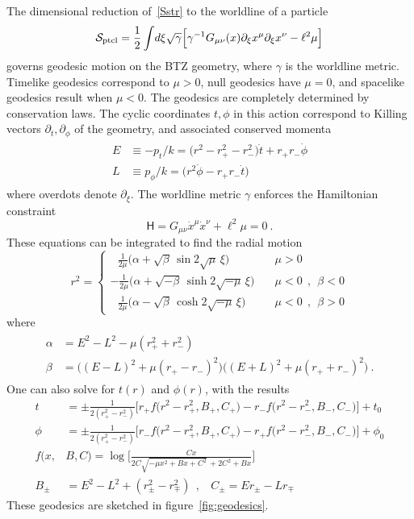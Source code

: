 \documentclass[11pt]{article}
\newcommand{\rcite}{\cite}
\def\tight#1{\! #1 \!}  %
\def\[{\left[}
\def\sfH{{\mathsf H}}
\def\half{\frac12}
\def\be{\begin{equation}}
\def\ee{\end{equation}}
\numberwithin{equation}{section}
\def\cS{\mathcal {S}} \def\cT{\mathcal {T}} \def\cU{\mathcal {U}}
\def\half{\frac12}
\begin{document}
The dimensional reduction of~\eqref{Sstr} to the worldline of a particle
\be
\label{Sptcl}
\cS_{\rm ptcl} = \half \int \!d\xi \sqrt{\gamma}\Big[ \gamma^{-1} G_{\mu\nu}(x) \partial_\xi x^\mu \partial_\xi x^\nu - \ell^2 \mu \Big]
\ee
governs geodesic motion on the BTZ geometry, where $\gamma$ is the worldline metric.  Timelike geodesics correspond to $\mu>0$, null geodesics have $\mu=0$, and spacelike geodesics result when $\mu<0$.
The geodesics are completely determined by conservation laws.  The cyclic coordinates $t,\phi$ in this action correspond to Killing vectors $\partial_t,\partial_\phi$ of the geometry, and associated conserved momenta
\begin{align}
\begin{split}
\label{ptclp}
E&\equiv -p_t/k = \big(r^2 - r_+^2 - r_-^2\big)\dot t +   r_+r_- \dot\phi 
\\[.2cm]
L &\equiv p_\phi/k =  \big(r^2\dot\phi - r_+r_- \dot t \big)  
\end{split}
\end{align}
where overdots denote $\partial_\xi$.  
The worldline metric $\gamma$ enforces the Hamiltonian constraint
\be
\label{Hamconst}
\sfH = G_{\mu\nu} \dot x^\mu \dot x^\nu + \ell^2 \mu = 0  ~.
\ee
These equations can be integrated to find the radial motion~\rcite{Cruz:1994ir,Hemming:2001we,Troost:2002wk,Ashok:2021ffx,Nippanikar:2021skr}
\be
\label{rsoln}
r^2 = 
\begin{cases}
~\;\,\frac{1}{2\mu}\Big( \alpha + \sqrt{\beta}\, \sin 2\sqrt{\mu}\, \xi \Big)  & \quad \mu>0
\\[.2cm]
-\frac{1}{2\mu}\Big( \alpha + \sqrt{-\beta}\, \sinh 2\sqrt{-\mu}\,\xi \Big) & \quad \mu<0~~,~~ \beta<0
\\[.2cm]
~\;\,\frac{1}{2\mu}\Big( \alpha - \sqrt{\beta}\, \cosh 2\sqrt{-\mu}\,\xi \Big) & \quad \mu<0~~,~~ \beta>0
\end{cases}
\ee
where
\begin{align}
\begin{split}
\alpha &= E^2 - L^2 - \mu (r_+^2 \tight+ r_-^2)
\\[.2cm]
\beta &= \Big( (E\tight-L)^2 + \mu(r_+ \tight- r_-)^2 \Big)\Big( (E\tight+L)^2 + \mu(r_+ \tight+r_-)^2 \Big) ~.
\end{split}
\end{align}
%
One can also solve for $t(r)$ and $\phi(r)$, with the results~\rcite{Cruz:1994ir}
\begin{align}
t &= \pm \frac{1}{2(r_+^2\tight-r_-^2)}\Big[ r_+ f\big(r^2\tight-r_+^2,B_+,C_+\big) - r_- f\big(r^2-r_-^2,B_-,C_-\big) \Big] + t_0
\\[.2cm]
\phi &= \pm \frac{1}{2(r_+^2\tight-r_-^2)}\Big[ r_- f\big(r^2\tight-r_+^2,B_+,C_+\big) - r_+ f\big(r^2-r_-^2,B_-,C_-\big) \Big] + \phi_0
\\[.2cm]
f(x,&B,C) = \log\Big[\frac{Cx}{2C\sqrt{-\mu x^2+Bx+C^2}\, +2C^2+Bx}\Big]
\\[.2cm]
B_\pm &= E^2\tight-L^2 + (r_\pm^2\tight-r_\mp^2)
~~,~~~~
C_\pm = E r_\pm \tight- L r_\mp
\end{align}
These geodesics are sketched in figure~\ref{fig:geodesics}.
\end{document}
